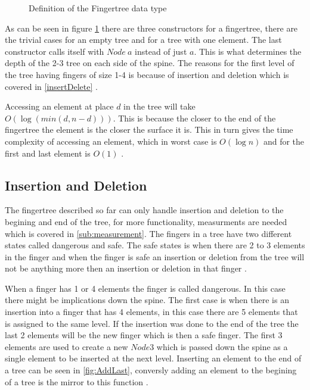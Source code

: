 \begin{figure}[h!]

\caption{Definition of the Fingertree data type \label{fig:DataTypeFingertree}\cite{fingertree}}
\end{figure}

As can be seen in figure \cref{fig:DataTypeFingertree} there are three constructors
for a fingertree, there are the trivial cases for an empty tree and for a tree
with one element. The last constructor calls itself with $Node~a$ instead of
just $a$. This is what determines the depth of the 2-3 tree on each side of the
spine. The reasons for the first level of the tree having fingers of size 1-4 is
because of insertion and deletion which is covered in \cref{insertDelete} \cite{fingertree}.

Accessing an element at place $d$ in the tree will take $O(\log(min(d,n-d)))$. This
is because the closer to the end of the fingertree the element is the closer the
surface it is. This in turn gives the time complexity of accessing an element,
which in worst case is $O(\log n)$ and for the first and last element is $O(1)$
\cite{fingertree}.

\subsection{Insertion and Deletion \label{insertDelete}}
The fingertree described so far can only handle insertion and deletion to the
begining and end of the tree, for more functionality, measurments are needed
which is covered in \cref{sub:measurement}.
The fingers in a tree have two different states called dangerous and safe. The
safe states is when there are 2 to 3 elements in the finger and when the finger
is safe an insertion or deletion from the tree will not be anything more then an
insertion or deletion in that finger \cite{fingertree}.

When a finger has 1 or 4 elements the finger is called dangerous. In this case
there might be implications down the spine. The first case is when there is an
insertion into a finger that has 4 elements, in this case there are 5 elements
that is assigned to the same level. If the insertion was done to the end of the
tree the last 2 elements will be the new finger which is then a safe finger. The
first 3 elements are used to create a new $Node3$ which is passed down the spine
as a single element to be inserted at the next level. Inserting an element to
the end of a tree can be seen in \cref{fig:AddLast}, conversly adding an element
to the begining of a tree is the mirror to this function \cite{fingertree}.

